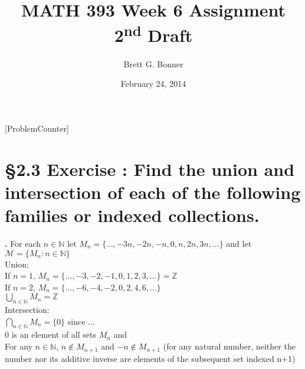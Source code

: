 \documentclass[a4paper,11pt]{article}
\begin{document}
\newtheorem*{theorem1}{Theorem}
\newtheorem*{theorem2}{Theorem}
\newtheorem*{theorem3}{Theorem}
\newtheorem*{theorem4}{Theorem}
\newtheorem*{theorem5}{Theorem}
\newtheorem*{theorem6}{Theorem}
\newtheorem*{theorem7}{Theorem}
\newtheorem*{theorem8}{Theorem}
\title{MATH 393 Week 6 Assignment 2\textsuperscript{nd} Draft}
\author{Brett G. Bonner}
\date{February 24, 2014}
\maketitle
\linespread{1.5}
\doublespacing
{}
[ProblemCounter]
\addtocounter{ProblemCounter}{1} %
\addtocounter{SubsectionCounter}{10} %
%

\section*{\S 2.3 Exercise : Find the union and intersection of each of the following families or indexed
collections.}
\textbf{.}
For each \(n \in \mathbb{N}\) let \(M_n = \{\ldots, -3n, -2n, -n, 0, n, 2n, 3n, \ldots\}\) and let \(\mathscr{M} = \{M_n: n \in \mathbb{N}\}\) \\
Union:\\
If \(n=1\), \(M_n = \{\ldots, -3, -2, -1, 0, 1, 2, 3, \ldots\} = \mathbb{Z}\)\\
If \(n=2\), \(M_n = \{\ldots, -6, -4, -2, 0, 2, 4, 6, \ldots\}\)\\
\(\bigcup\limits_{n \in \mathbb{N}}M_n = \mathbb{Z}\)\\

\noindent Intersection:\\
\(\bigcap\limits_{n \in \mathbb{N}}M_n = \{0\}\) since $\ldots$\\
0 is an element of all sets \(M_n\) and \\
For any \(n \in \mathbb{N}\), \(n \notin M_{n+1}\) and \(-n \notin M_{n+1}\) (for any natural number, neither the number nor its additive inverse are elements of the subsequent set indexed n+1)


\newpage
\setcounter{SubsectionCounter}{4}
\setcounter{ProblemCounter}{3}
\end{document}
